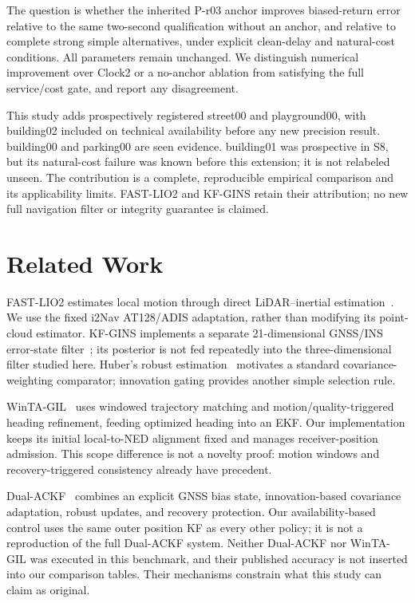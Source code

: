 \documentclass[conference]{IEEEtran}
\begin{document}
The question is whether the inherited P-r03 anchor improves biased-return error relative to the same two-second qualification without an anchor, and relative to complete strong simple alternatives, under explicit clean-delay and natural-cost conditions. All parameters remain unchanged. We distinguish numerical improvement over Clock2 or a no-anchor ablation from satisfying the full service/cost gate, and report any disagreement.

This study adds prospectively registered street00 and playground00, with building02 included on technical availability before any new precision result. building00 and parking00 are seen evidence. building01 was prospective in S8, but its natural-cost failure was known before this extension; it is not relabeled unseen. The contribution is a complete, reproducible empirical comparison and its applicability limits. FAST-LIO2 and KF-GINS retain their attribution; no new full navigation filter or integrity guarantee is claimed.
\section{Related Work}
FAST-LIO2 estimates local motion through direct LiDAR--inertial estimation~\cite{fastlio2}. We use the fixed i2Nav AT128/ADIS adaptation, rather than modifying its point-cloud estimator. KF-GINS implements a separate 21-dimensional GNSS/INS error-state filter~\cite{kfgins}; its posterior is not fed repeatedly into the three-dimensional filter studied here. Huber's robust estimation~\cite{huber} motivates a standard covariance-weighting comparator; innovation gating provides another simple selection rule.

WinTA-GIL~\cite{winta} uses windowed trajectory matching and motion/quality-triggered heading refinement, feeding optimized heading into an EKF. Our implementation keeps its initial local-to-NED alignment fixed and manages receiver-position admission. This scope difference is not a novelty proof: motion windows and recovery-triggered consistency already have precedent.

Dual-ACKF~\cite{dual} combines an explicit GNSS bias state, innovation-based covariance adaptation, robust updates, and recovery protection. Our availability-based control uses the same outer position KF as every other policy; it is not a reproduction of the full Dual-ACKF system. Neither Dual-ACKF nor WinTA-GIL was executed in this benchmark, and their published accuracy is not inserted into our comparison tables. Their mechanisms constrain what this study can claim as original.
\end{document}
